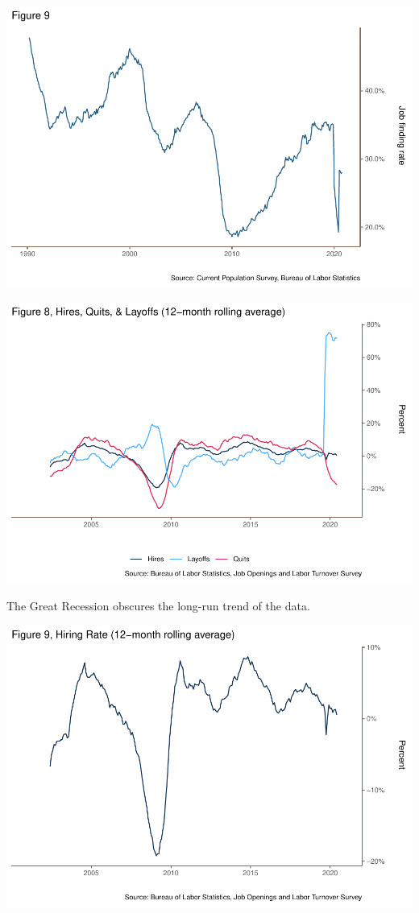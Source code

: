 \documentclass[
  11pt,
]{article}
\begin{document}
\begin{center}\includegraphics{JOLTS_files/figure-latex/unnamed-chunk-13-1} \end{center}

\begin{center}\includegraphics{JOLTS_files/figure-latex/unnamed-chunk-14-1} \end{center}

The Great Recession obscures the long-run trend of the data.

\begin{center}\includegraphics{JOLTS_files/figure-latex/unnamed-chunk-15-1} \end{center}
\end{document}
